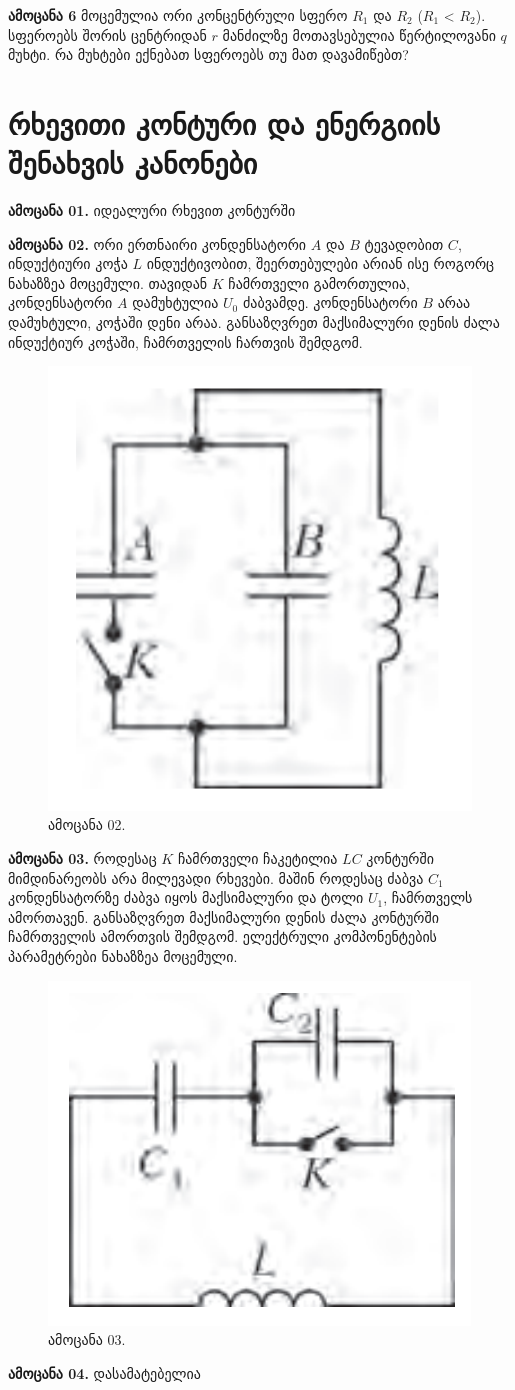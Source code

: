 \documentclass{book}
\begin{document}
\textbf{ამოცანა 6} მოცემულია ორი კონცენტრული სფერო $R_1$ და $R_2$ ($R_1$ < $R_2$). სფეროებს შორის ცენტრიდან $r$ მანძილზე მოთავსებულია წერტილოვანი $q$ მუხტი. რა მუხტები ექნებათ სფეროებს თუ მათ დავამიწებთ?

\section{რხევითი კონტური და ენერგიის შენახვის კანონები}
\textbf{ამოცანა 01.} იდეალური რხევით კონტურში 

\textbf{ამოცანა 02.} ორი ერთნაირი კონდენსატორი $A$ და $B$ ტევადობით $C$, ინდუქტიური კოჭა $L$ ინდუქტივობით, შეერთებულები არიან ისე როგორც ნახაზზეა მოცემული. თავიდან $K$ ჩამრთველი გამორთულია, კონდენსატორი $A$ დამუხტულია $U_0$ ძაბვამდე. კონდენსატორი $B$ არაა დამუხტული, კოჭაში დენი არაა. განსაზღვრეთ მაქსიმალური დენის ძალა ინდუქტიურ კოჭაში, ჩამრთველის ჩართვის შემდგომ.
	\begin{figure}[H]
		\centering
		\includegraphics[width=0.2\columnwidth]{figures/Screenshot 2022-11-11 234359}
		\caption{ამოცანა 02.}
	\end{figure}

\textbf{ამოცანა 03.} როდესაც $K$ ჩამრთველი ჩაკეტილია $LC$ კონტურში მიმდინარეობს არა მილევადი რხევები. მაშინ როდესაც ძაბვა $C_1$ კონდენსატორზე ძაბვა იყოს მაქსიმალური და ტოლი $U_1$, ჩამრთველს ამორთავენ. განსაზღვრეთ მაქსიმალური დენის ძალა კონტურში ჩამრთველის ამორთვის შემდგომ. ელექტრული კომპონენტების პარამეტრები ნახაზზეა მოცემული.
	\begin{figure}[H]
		\centering
		\includegraphics[width=0.2\columnwidth]{figures/Screenshot 2022-11-11 235736}
		\caption{ამოცანა 03.}
	\end{figure}

\textbf{ამოცანა 04.} დასამატებელია
\end{document}
